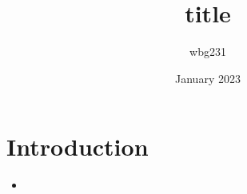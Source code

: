 \documentclass{article}
\title{title }
\author{wbg231 }
\date{January 2023}
\begin{document}
\maketitle

\section{Introduction}
\begin{itemize}
\item
\end{itemize}
\end{document}
